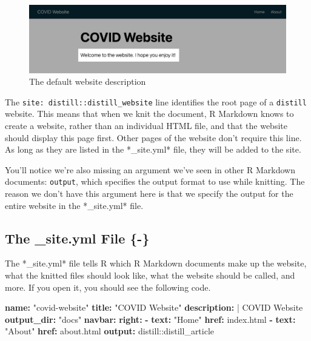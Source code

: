\documentclass[
]{book}
\newenvironment{Shaded}{\begin{snugshade}}{\end{snugshade}}
\newcommand{\AttributeTok}[1]{\textcolor[rgb]{0.13,0.29,0.53}{#1}}
\newcommand{\CharTok}[1]{\textcolor[rgb]{0.31,0.60,0.02}{#1}}
\newcommand{\FunctionTok}[1]{\textcolor[rgb]{0.13,0.29,0.53}{\textbf{#1}}}
\newcommand{\KeywordTok}[1]{\textcolor[rgb]{0.13,0.29,0.53}{\textbf{#1}}}
\newcommand{\NormalTok}[1]{#1}
\newcommand{\StringTok}[1]{\textcolor[rgb]{0.31,0.60,0.02}{#1}}
\begin{document}
\begin{figure}
\includegraphics[width=1\linewidth]{assets/website-description} \caption{The default website description}\label{fig:website-description}
\end{figure}

The \texttt{site:\ distill::distill\_website} line identifies the root page of a \texttt{distill} website. This means that when we knit the document, R Markdown knows to create a website, rather than an individual HTML file, and that the website should display this page first. Other pages of the website don't require this line. As long as they are listed in the *\_site.yml* file, they will be added to the site.

You'll notice we're also missing an argument we've seen in other R Markdown documents: \texttt{output}, which specifies the output format to use while knitting. The reason we don't have this argument here is that we specify the output for the entire website in the *\_site.yml* file.

\hypertarget{the-_site.yml-file--}{%
\subsection{The \_site.yml File \{-\}}\label{the-_site.yml-file--}}

The *\_site.yml* file tells R which R Markdown documents make up the website, what the knitted files should look like, what the website should be called, and more. If you open it, you should see the following code.

\begin{Shaded}
\begin{Highlighting}[]
\FunctionTok{name}\KeywordTok{:}\AttributeTok{ }\StringTok{"covid{-}website"}
\FunctionTok{title}\KeywordTok{:}\AttributeTok{ }\StringTok{"COVID Website"}
\FunctionTok{description}\KeywordTok{: }\CharTok{|}
\NormalTok{  COVID Website}
\FunctionTok{output\_dir}\KeywordTok{:}\AttributeTok{ }\StringTok{"docs"}
\FunctionTok{navbar}\KeywordTok{:}
\AttributeTok{  }\FunctionTok{right}\KeywordTok{:}
\AttributeTok{    }\KeywordTok{{-}}\AttributeTok{ }\FunctionTok{text}\KeywordTok{:}\AttributeTok{ }\StringTok{"Home"}
\AttributeTok{      }\FunctionTok{href}\KeywordTok{:}\AttributeTok{ index.html}
\AttributeTok{    }\KeywordTok{{-}}\AttributeTok{ }\FunctionTok{text}\KeywordTok{:}\AttributeTok{ }\StringTok{"About"}
\AttributeTok{      }\FunctionTok{href}\KeywordTok{:}\AttributeTok{ about.html}
\FunctionTok{output}\KeywordTok{:}\AttributeTok{ distill::distill\_article}
\end{Highlighting}
\end{Shaded}
\end{document}
